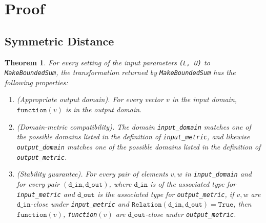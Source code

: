 \documentclass[11pt,a4paper]{article}
\newtheorem{theorem}{Theorem}
\theoremstyle{definition}
\newcommand{\din}{\texttt{d\_in}}
\newcommand{\dout}{\texttt{d\_out}}
\newcommand{\True}{\texttt{True}}
\newcommand{\function}{\texttt{function}}
\begin{document}
\section{Proof}
\subsection{Symmetric Distance}
\begin{theorem}
    For every setting of the input parameters \texttt{(L, U)} to \texttt{MakeBoundedSum}, the transformation returned by \texttt{MakeBoundedSum} has the following properties:
    \begin{enumerate}
        \item \textup{(Appropriate output domain).} For every vector $v$ in the input domain, $\function(v)$ is in the output domain.
        
        \item \textup{(Domain-metric compatibility).} The domain \texttt{input\_domain} matches one of the possible domains listed in the definition of \texttt{input\_metric}, and likewise \texttt{output\_domain} matches one of the possible domains listed in the definition of \texttt{output\_metric}.
        
        \item \textup{(Stability guarantee).} For every pair of elements $v, w$ in \texttt{input\_domain} and for every pair $(\din, \dout)$,  where $\din$ is of the associated type for \texttt{input\_metric} and $\dout$ is the associated type for \texttt{output\_metric}, if $v,w$ are $\din$-close under \texttt{input\_metric} and $\texttt{Relation}(\din, \dout) = \True$, then $\function(v)$, \texttt{function}$(v)$ are $\dout$-close under \texttt{output\_metric}.
    \end{enumerate}
\end{theorem}
\end{document}
